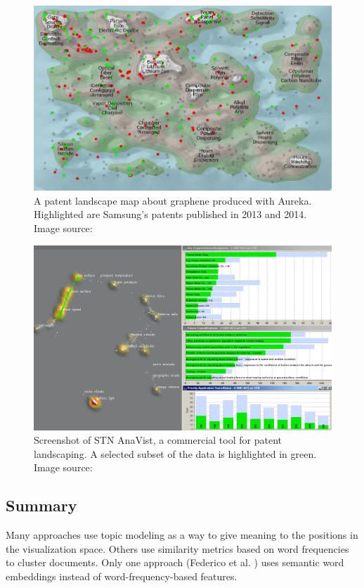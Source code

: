 \begin{figure}[!]
\centering
\includegraphics[width=\textwidth]{img/aureka}
\caption{A patent landscape map about graphene produced with Aureka. Highlighted are Samsung's patents published in 2013 and 2014. Image source: \cite{graphene}}
\label{fig:aureka}
\end{figure}

\begin{figure}
\includegraphics[width=\textwidth]{img/anavist}
\caption{Screenshot of STN AnaVist, a commercial tool for patent landscaping. A selected subset of the data is highlighted in green. Image source: \cite{Ruotsalainen2008}}
\label{fig:anavist}
\end{figure}

\subsection{Summary}

Many approaches use topic modeling as a way to give meaning to the positions in the visualization space.
Others use similarity metrics based on word frequencies to cluster documents.
Only one approach (Federico et al. \cite{Federico2017}) uses semantic word embeddings instead of word-frequency-based features.

